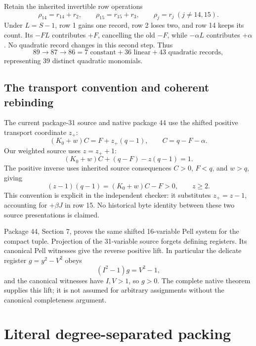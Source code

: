 \documentclass[11pt,a4paper]{article}
\theoremstyle{remark}
\begin{document}
Retain the inherited invertible row operations
\[
 \rho_{14}=r_{14}+r_2,\qquad
 \rho_{15}=r_{15}+r_3,\qquad \rho_j=r_j\ (j\ne14,15).
\]
Under \(L=S-1\), row 1 gains one record, row 2 loses two, and
row 14 keeps its count. Its \(-FL\) contributes \(+F\), cancelling
the old \(-F\), while \(-\alpha L\) contributes \(+\alpha\).
No quadratic record changes in this second step. Thus
\[
 89\longrightarrow87\longrightarrow86
 =7\text{ constant}+36\text{ linear}+43\text{ quadratic records},
\]
representing 39 distinct quadratic monomials.

\subsection{The transport convention and coherent rebinding}

The current package-31 source and native package 44 use the shifted
positive transport coordinate \(z_+\):
\[
 (K_0+w)C=F+z_+(q-1),\qquad C=q-F-\alpha.
\]
Our weighted source uses \(z=z_++1\):
\[
 (K_0+w)C+(q-F)-z(q-1)=1.
\]
The positive inverse uses inherited source consequences
\(C>0\), \(F<q\), and \(w>q\), giving
\[
 (z-1)(q-1)=(K_0+w)C-F>0,\qquad z\ge2.
\]
This convention is explicit in the independent checker: it substitutes
\(z_+=z-1\), accounting for \(+\beta J\) in row 15. No historical
byte identity between these two source presentations is claimed.

Package 44, Section 7, proves the same shifted 16-variable Pell system
for the compact tuple. Projection of the 31-variable source forgets
defining registers. Its canonical Pell witnesses give the reverse
positive lift. In particular the delicate register
\(g=y^2-V^2\) obeys
\[
 (I^2-1)g=V^2-1,
\]
and the canonical witnesses have \(I,V>1\), so \(g>0\).
The complete native theorem supplies this lift; it is not assumed
for arbitrary assignments without the canonical completeness argument.

\section{Literal degree-separated packing}
\label{sec:packing}
\end{document}
